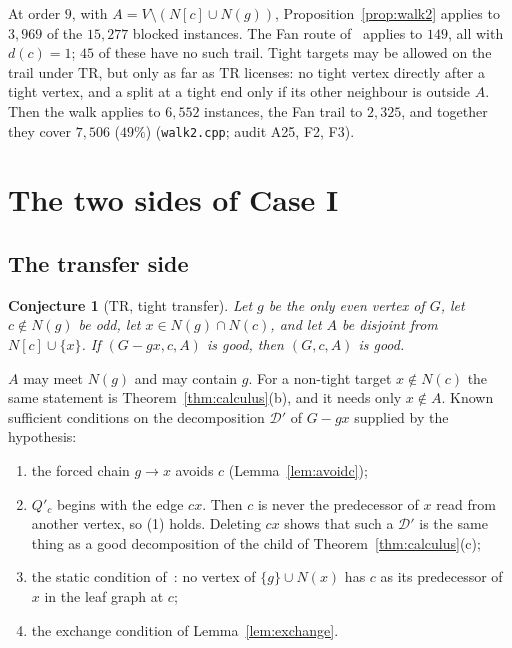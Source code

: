 \documentclass[11pt]{amsart}
\newtheorem{conjecture}[theorem]{Conjecture}
\theoremstyle{definition}
\newcommand{\cD}{\mathcal D}
\newcommand{\TR}{\mathrm{TR}}
\begin{document}
At order $9$, with $A=V\setminus(N[c]\cup N(g))$, Proposition~\ref{prop:walk2} applies to $3{,}969$
of the $15{,}277$ blocked instances. The Fan route of~\cite[Prop.~5.3]{L1S} applies to $149$, all
with $d(c)=1$; $45$ of these have no such trail. Tight targets may be allowed on the trail under
$\TR$, but only as far as $\TR$ licenses: no tight vertex directly after a tight vertex, and a split
at a tight end only if its other neighbour is outside $A$. Then the walk applies to $6{,}552$
instances, the Fan trail to $2{,}325$, and together they cover $7{,}506$ ($49\%$)
(\texttt{walk2.cpp}; audit A25, F2, F3).

\section{The two sides of Case I}\label{sec:two}

\subsection{The transfer side}

\begin{conjecture}[$\TR$, tight transfer]\label{conj:tr}
Let $g$ be the only even vertex of $G$, let $c\notin N(g)$ be odd, let $x\in N(g)\cap N(c)$, and
let $A$ be disjoint from $N[c]\cup\{x\}$. If $(G-gx,c,A)$ is good, then $(G,c,A)$ is good.
\end{conjecture}

$A$ may meet $N(g)$ and may contain $g$. For a non-tight target $x\notin N(c)$ the same statement is
Theorem~\ref{thm:calculus}(b), and it needs only $x\notin A$. Known sufficient conditions on the
decomposition $\cD'$ of $G-gx$ supplied by the hypothesis:
\begin{enumerate}
\item the forced chain $g\to x$ avoids $c$ (Lemma~\ref{lem:avoidc});
\item $Q'_c$ begins with the edge $cx$. Then $c$ is never the predecessor of $x$ read from another
vertex, so (1) holds. Deleting $cx$ shows that such a $\cD'$ is the same thing as a good
decomposition of the child of Theorem~\ref{thm:calculus}(c);
\item the static condition of~\cite[Theorem~3.3]{TF}: no vertex of $\{g\}\cup N(x)$ has $c$ as its
predecessor of $x$ in the leaf graph at $c$;
\item the exchange condition of Lemma~\ref{lem:exchange}.
\end{enumerate}
\end{document}
